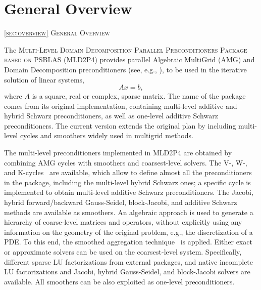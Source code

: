 \section{General Overview\label{sec:overview}}
         {\textsc{\ref{sec:overview} General Overview}}
            
The \textsc{Multi-Level Domain Decomposition Parallel Preconditioners Package based on
PSBLAS (MLD2P4}) provides parallel Algebraic MultiGrid (AMG) and Domain 
Decomposition preconditioners (see, e.g., \cite{Briggs2000,Stuben_01,dd2_96}),
to be used in the iterative solution of  linear systems,
\begin{equation} 
Ax=b, 
\label{system1}
\end{equation} 
where $A$ is a square, real or complex, sparse matrix. 
%
%
The name of the package comes from its original implementation, containing
multi-level additive and hybrid Schwarz preconditioners, as well as one-level additive
Schwarz preconditioners. The current version extends the original plan by including
multi-level cycles and smoothers widely used in multigrid methods.

The multi-level preconditioners implemented in MLD2P4 are obtained by combining
AMG cycles with smoothers and coarsest-level solvers. The V-, W-, and
K-cycles~\cite{Briggs2000,Notay2008} are available, which allow to define
almost all the preconditioners in the package, including the multi-level hybrid
Schwarz ones; a specific cycle is implemented to obtain multi-level additive
Schwarz preconditioners. The Jacobi, hybrid
forward/backward Gauss-Seidel, block-Jacobi, and additive Schwarz methods
are available as smoothers. An algebraic approach is used to generate a hierarchy of
coarse-level matrices and operators, without explicitly using any information on the
geometry of the original problem, e.g., the discretization of a PDE. To this end,
the smoothed aggregation technique~\cite{BREZINA_VANEK,VANEK_MANDEL_BREZINA}
is applied. Either exact or approximate solvers can be used on the coarsest-level
system. Specifically, different sparse LU factorizations from external
packages, and native incomplete LU factorizations and Jacobi, hybrid Gauss-Seidel,
and block-Jacobi solvers are available. All smoothers can be also exploited as one-level 
preconditioners.

